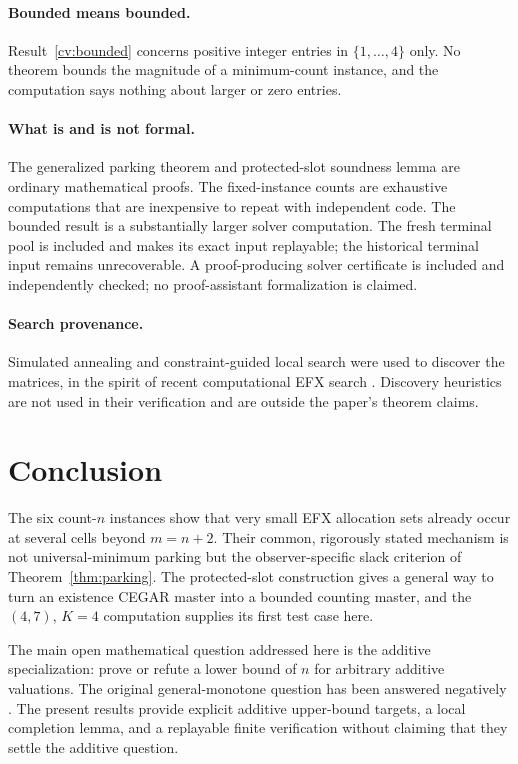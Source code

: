 \documentclass[11pt]{article}
\theoremstyle{plain}
\theoremstyle{definition}
\begin{document}
\paragraph{Bounded means bounded.}
Result~\ref{cv:bounded} concerns positive integer entries in
$\{1,\ldots,4\}$ only.  No theorem bounds the magnitude of a minimum-count
instance, and the computation says nothing about larger or zero entries.

\paragraph{What is and is not formal.}
The generalized parking theorem and protected-slot soundness lemma are ordinary
mathematical proofs.  The fixed-instance counts are exhaustive computations
that are inexpensive to repeat with independent code.  The bounded result is a
substantially larger solver computation.  The fresh terminal pool is included
and makes its exact input replayable; the historical terminal input remains
unrecoverable.  A proof-producing solver certificate is included and
independently checked; no proof-assistant formalization is claimed.

\paragraph{Search provenance.}
Simulated annealing and constraint-guided local search were used to discover
the matrices, in the spirit of recent computational EFX search
\cite{Branzei2025}.  Discovery heuristics are not used in their verification
and are outside the paper's theorem claims.

\section{Conclusion}

The six count-$n$ instances show that very small EFX allocation sets already
occur at several cells beyond $m=n+2$.  Their common, rigorously stated
mechanism is not universal-minimum parking but the observer-specific slack
criterion of Theorem~\ref{thm:parking}.  The protected-slot construction gives
a general way to turn an existence CEGAR master into a bounded counting master,
and the $(4,7)$, $K=4$ computation supplies its first test case here.

The main open mathematical question addressed here is the additive
specialization: prove or refute a lower bound of $n$ for arbitrary additive
valuations.  The original general-monotone question has been answered
negatively \cite{Akrami2026SAT}.  The present results provide explicit additive
upper-bound targets, a local completion lemma, and a replayable finite
verification without claiming that they settle the additive question.
\end{document}
